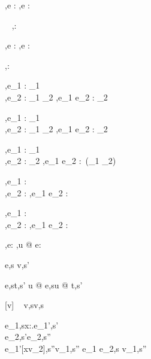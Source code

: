   {\Gamma,\Sigma \infers e : \tau}
  {\Gamma,\Sigma \infers \Edit e : \Task \tau}

  {\ }
  {\Gamma,\Sigma \infers \Enter \tau : \Task \tau}

  {\Gamma,\Sigma \infers e : \Reference \tau}
  {\Gamma,\Sigma \infers \Update e : \Task \tau}


  { }
  {\Gamma,\Sigma \infers \Fail : \Task \alpha}


  {\Gamma,\Sigma \infers e_1 : \Task \tau_1 \\
   \Gamma,\Sigma \infers e_2 : \tau_1 \to \Task \tau_2}
  {\Gamma,\Sigma \infers e_1 \Then e_2 : \Task \tau_2}


  {\Gamma,\Sigma \infers e_1 : \Task \tau_1 \\
   \Gamma,\Sigma \infers e_2 : \tau_1 \to \Task \tau_2}
  {\Gamma,\Sigma \infers e_1 \Next e_2 : \Task \tau_2}


  {\Gamma,\Sigma \infers e_1 : \Task \tau_1 \\
   \Gamma,\Sigma \infers e_2 : \Task \tau_2}
  {\Gamma,\Sigma \infers e_1 \And e_2 : \Task\,(\tau_1 \times \tau_2)}


  {\Gamma,\Sigma \infers e_1 : \Task \tau \\
   \Gamma,\Sigma \infers e_2 : \Task \tau }
  {\Gamma,\Sigma \infers e_1 \Or e_2 : \Task \tau}


  {\Gamma,\Sigma \infers e_1 : \Task \tau \\
   \Gamma,\Sigma \infers e_2 : \Task \tau }
  {\Gamma,\Sigma \infers e_1 \Xor e_2 : \Task \tau}

  {\Gamma,\Sigma\infers e:\Task\tau}
  {\Gamma,\Sigma\infers u @ e:\Task\tau}





  {e,s \evaluate v,s'}

    {e,s\evaluate t,s'}
    {u @ e,s\evaluate u @ t,s'}

[v\in{}]
  {\ }
  {v,s\evaluate v,s}

  {e_1,s\evaluate \lambda x:\tau.e_1',s'\\
   e_2,s'\evaluate e_2,s''\\
   e_1'[x\mapsto v_2],s''\evaluate v_1,s''}
  {e_1 e_2,s \evaluate v_1,s''}

